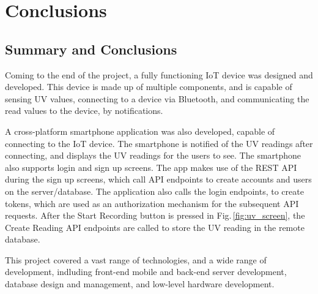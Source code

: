 \documentclass[12pt,openany,a4paper]{book}
\newcommand{\fig}[1]  {Fig.\,\ref{#1}}		%
\begin{document}
\cleardoublepage

\chapter{Conclusions}

\section{Summary and Conclusions}

Coming to the end of the project, a fully functioning IoT device was designed
and developed. This device is made up of multiple components, and is capable of
sensing UV values, connecting to a device via Bluetooth, and communicating
the read values to the device, by notifications.

A cross-platform smartphone application was also developed, capable of connecting
to the IoT device. The smartphone is notified of the UV readings after connecting,
and displays the UV readings for the users to see. The smartphone also supports
login and sign up screens. The app makes use of the REST API during the sign up screens,
which call API endpoints to create accounts and users on the server/database. The
application also calls the login endpoints, to create tokens, which are used as
an authorization mechanism for the subsequent API requests. After the Start Recording
button is pressed in \fig{fig:uv_screen}, the Create Reading API endpoints are called
to store the UV reading in the remote database.

This project covered a vast range of technologies, and a wide range of development,
indluding front-end mobile and back-end server development, database design and
management, and low-level hardware development.


\appendix


\newpage
{}
\mbox{}
\newpage

\end{document}
